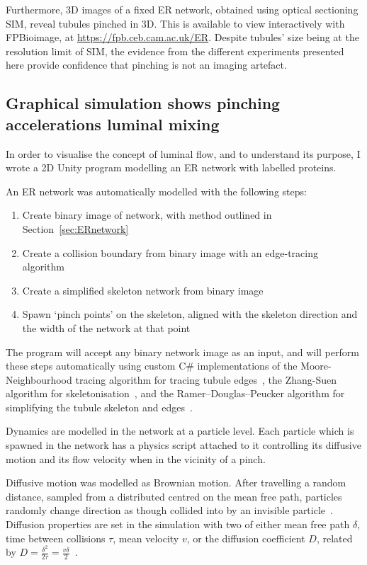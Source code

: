 Furthermore, 3D images of a fixed ER network, obtained using optical sectioning SIM, reveal tubules pinched in 3D. 
This is available to view interactively with FPBioimage, at \url{https://fpb.ceb.cam.ac.uk/ER}. 
Despite tubules' size being at the resolution limit of SIM, the evidence from the different experiments presented here provide confidence that pinching is not an imaging artefact. 

\subsection{Graphical simulation shows pinching accelerations luminal mixing}
In order to visualise the concept of luminal flow, and to understand its purpose, I wrote a 2D Unity program modelling an ER network with labelled proteins. 

An ER network was automatically modelled with the following steps:
\begin{enumerate}
	\item Create binary image of network, with method outlined in Section~\ref{sec:ERnetwork}
	\item Create a collision boundary from binary image with an edge-tracing algorithm
	\item Create a simplified skeleton network from binary image
	\item Spawn `pinch points' on the skeleton, aligned with the skeleton direction and the width of the network at that point
\end{enumerate}
The program will accept any binary network image as an input, and will perform these steps automatically using custom C\# implementations of the Moore-Neighbourhood tracing algorithm for tracing tubule edges~\cite{moore-neighbourhood}, the Zhang-Suen algorithm for skeletonisation~\cite{zhang1984fast}, and the Ramer–Douglas–Peucker algorithm for simplifying the tubule skeleton and edges~\cite{ramer1972iterative, douglas1973algorithms}. 

Dynamics are modelled in the network at a particle level. 
Each particle which is spawned in the network has a physics script attached to it controlling its diffusive motion and its flow velocity when in the vicinity of a pinch. 

Diffusive motion was modelled as Brownian motion. \cite{einstein1905molekularkinetischen}
After travelling a random distance, sampled from a distributed centred on the mean free path, particles randomly change direction as though collided into by an invisible particle~\cite{lucretius1631}. 
Diffusion properties are set in the simulation with two of either mean free path $\delta$, time between collisions $\tau$, mean velocity $v$, or the diffusion coefficient $D$, related by $D=\frac{\delta^2}{2\tau}=\frac{v\delta}{2}$~\cite[\textit{ch. 19}]{fishbane1998physics}. 


